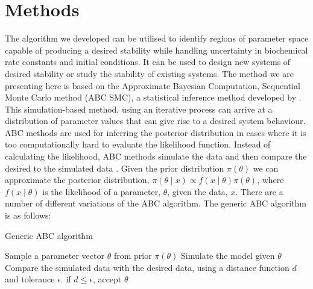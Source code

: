 \section{Methods}

The algorithm we developed can be utilised to identify regions of parameter space capable of producing a desired stability while handling uncertainty in biochemical rate constants and initial conditions. It can be used to design new systems of desired stability or study the stability of existing systems. The method we are presenting here is based on the Approximate Bayesian Computation, Sequential Monte Carlo method (ABC SMC), a statistical inference method developed by \textcite{Toni:2009tr}. This simulation-based method, using an iterative process can arrive at a distribution of parameter values that can give rise to a desired system behaviour. 
ABC methods are used for inferring the posterior distribution in cases where it is too computationally hard to evaluate the likelihood function. Instead of calculating the likelihood, ABC methods simulate the data and then compare the desired to the simulated data \autocite{Toni:2009tr}. Given the prior distribution $\pi(\theta)$ we can approximate the posterior distribution, $\pi(\theta\mid x)\propto f(x\mid\theta)\pi(\theta)$, where $f(x\mid\theta)$ is the likelihood of a parameter, $\theta$, given the data, $x$. There are a number of different variations of the ABC algorithm. The generic ABC algorithm is as follows:
	
	\begin{algorithm}[h]
	\label{alg:ABC}
  \caption{Generic ABC algorithm}
 \begin{algorithmic}[1]
    \Statex
	\State Sample a parameter vector $\theta$ from prior $\pi(\theta)$
	\State Simulate the model given $\theta$
    \State Compare the simulated data with the desired data, using a distance function $d$ and tolerance $\epsilon$. if $d \leq \epsilon$, accept $\theta$ 
   
  \end{algorithmic}
\end{algorithm}


